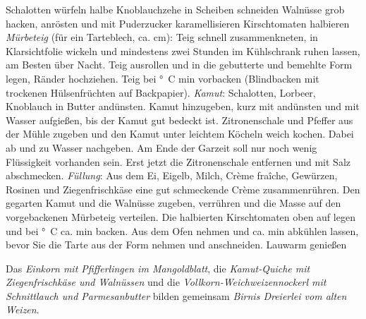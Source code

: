 \begin{recipe}
    \preparation
    {
        \step Schalotten würfeln
        \step halbe Knoblauchzehe in Scheiben schneiden
        \step Walnüsse grob hacken, anrösten und mit Puderzucker karamellisieren
        \step Kirschtomaten halbieren
        \step \emph{Mürbeteig} (für ein Tarteblech, ca. \unit[15x30]{cm}): Teig schnell zusammenkneten, in Klarsichtfolie wickeln und mindestens zwei Stunden im Kühlschrank ruhen lassen, am Besten über Nacht. 
        \step Teig ausrollen und in die gebutterte und bemehlte Form legen, Ränder hochziehen. Teig bei \unit[160]{\degree C} \unit[15]{min} vorbacken (Blindbacken mit trockenen Hülsenfrüchten auf Backpapier).
        \step \emph{Kamut}: Schalotten, Lorbeer, Knoblauch in Butter andünsten. Kamut hinzugeben, kurz mit andünsten und mit Wasser aufgießen, bis der Kamut gut bedeckt ist. 
        \step Zitronenschale und Pfeffer aus der Mühle zugeben und den Kamut unter leichtem Köcheln weich kochen. Dabei ab und zu Wasser nachgeben. Am Ende der Garzeit soll nur noch wenig Flüssigkeit vorhanden sein. 
        \step Erst jetzt die Zitronenschale entfernen und mit Salz abschmecken.
        \step \emph{Füllung}: Aus dem Ei, Eigelb, Milch, Crème fraîche, Gewürzen, Rosinen und Ziegenfrischkäse eine gut schmeckende Crème zusammenrühren. 
        \step Den gegarten Kamut und die Walnüsse zugeben, verrühren und die Masse auf den vorgebackenen Mürbeteig verteilen. 
        \step Die halbierten Kirschtomaten oben auf legen und bei \unit[160]{\degree C} ca. \unit[30]{min} backen.
        \step Aus dem Ofen nehmen und ca. \unit[10]{min} abkühlen lassen, bevor Sie die Tarte aus der Form nehmen und anschneiden. 
		\step Lauwarm genießen
    }
    
    \hint
    {
    	Das \emph{Einkorn mit Pfifferlingen im Mangoldblatt}, die \emph{Kamut-Quiche mit Ziegenfrischkäse und Walnüssen} und die \emph{Vollkorn-Weichweizennockerl mit Schnittlauch und Parmesanbutter} bilden gemeinsam \emph{Birnis Dreierlei vom alten Weizen}.
    }
\end{recipe}